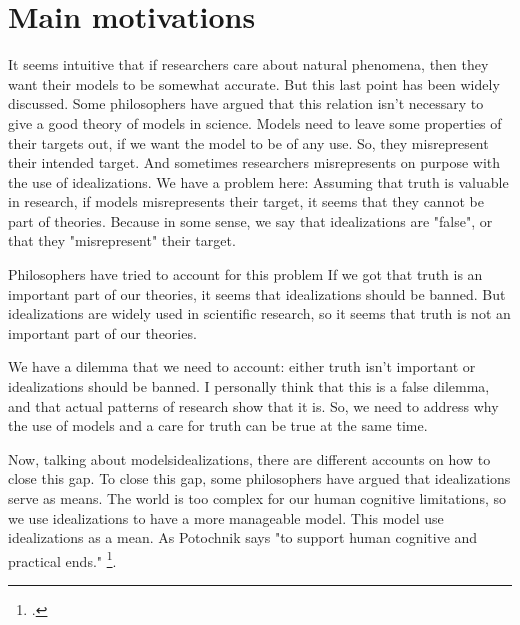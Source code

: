 \section{Main motivations}

It seems intuitive that if researchers care about natural phenomena, then they want their models to be somewhat accurate.
But this last point has been widely discussed.
Some philosophers have argued that this relation isn't necessary to give a good theory of models in science.
Models need to leave some properties of their targets out, if we want the model to be of any use. %
So, they misrepresent their intended target.
And sometimes researchers misrepresents on purpose with the use of idealizations. %
We have a problem here: Assuming that truth is valuable in research, if models misrepresents their target, it seems that they cannot be part of theories.
Because in some sense, we say that idealizations are "false", or that they "misrepresent" their target.

Philosophers have tried to account for this problem
If we got that truth is an important part of our theories, it seems that idealizations should be banned.
But idealizations are widely used in scientific research, so it seems that truth is not an important part of our theories.

We have a dilemma that we need to account: either truth isn't important or idealizations should be banned.
I personally think that this is a false dilemma, and that actual patterns of research show that it is.
So, we need to address why the use of models and a care for truth can be true at the same time.

Now, talking about models\/idealizations, there are different accounts on how to close this gap.
To close this gap, some philosophers have argued that idealizations serve as means.
The world is too complex for our human cognitive limitations, so we use idealizations to have a more manageable model.
This model use idealizations as a mean. As Potochnik says "to support human cognitive and practical ends." \footcite[][p. ix]{Potochnik2017-POTIAT-3}.

